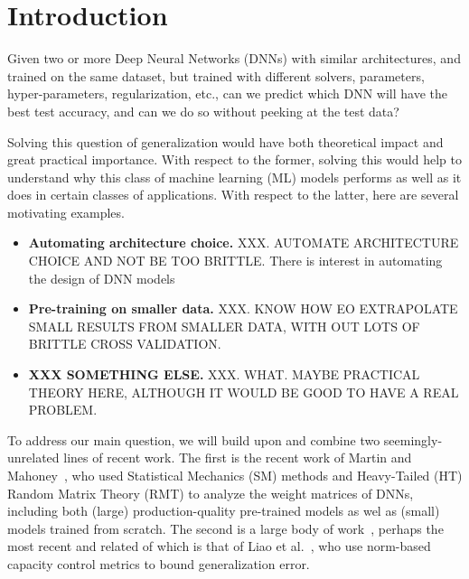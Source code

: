 
\section{Introduction}
\label{sxn:intro}

Given two or more Deep Neural Networks (DNNs) with  similar architectures, and trained on the same dataset, but trained with different solvers, parameters, hyper-parameters, regularization, etc., can we predict which DNN will have the best test accuracy, and can we do so without peeking at the test data?   

Solving this question of generalization would have both theoretical impact and great practical importance. 
With respect to the former, solving this would help to understand why this class of machine learning (ML) models performs as well as it does in certain classes of applications.
With respect to the latter, here are several motivating examples.
\begin{itemize}
\item
\textbf{Automating architecture choice.}
XXX.  AUTOMATE ARCHITECTURE CHOICE AND NOT BE TOO BRITTLE.
There is interest in automating the design of DNN models

\item
\textbf{Pre-training on smaller data.}
XXX.  KNOW HOW EO EXTRAPOLATE SMALL RESULTS FROM SMALLER DATA, WITH OUT LOTS OF BRITTLE CROSS VALIDATION.
\item
\textbf{XXX SOMETHING ELSE.}
XXX.  WHAT.  MAYBE PRACTICAL THEORY HERE, ALTHOUGH IT WOULD BE GOOD TO HAVE A REAL PROBLEM.
\end{itemize}

To address our main question, we will build upon and combine two seemingly-unrelated lines of recent work.
The first is the recent work of Martin and Mahoney~\cite{MM17_TR,MM18_TR}, who used Statistical Mechanics (SM) methods and Heavy-Tailed (HT) Random Matrix Theory (RMT) to analyze the weight matrices of DNNs, including both (large) production-quality pre-trained models as wel as (small) models trained from scratch.
The second is a large body of work~\cite{XXX-XXX,XXX-XXX,XXX-XXX,XXX-XXX}, perhaps the most recent and related of which is that of Liao et al.~\cite{LMBx18_TR}, who use norm-based capacity control metrics to bound generalization error.

